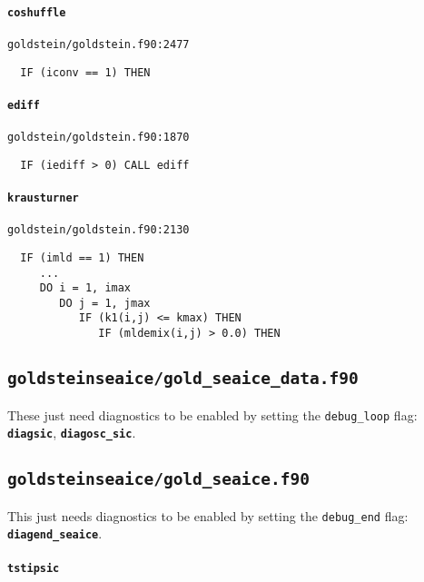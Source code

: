 \documentclass[a4paper,10pt,article]{memoir}
\begin{document}
\paragraph{\texttt{coshuffle}}

\texttt{goldstein/goldstein.f90:2477}

\begin{verbatim}
  IF (iconv == 1) THEN
\end{verbatim}

\paragraph{\texttt{ediff}}

\texttt{goldstein/goldstein.f90:1870}

\begin{verbatim}
  IF (iediff > 0) CALL ediff
\end{verbatim}

\paragraph{\texttt{krausturner}}

\texttt{goldstein/goldstein.f90:2130}

\begin{verbatim}
  IF (imld == 1) THEN
     ...
     DO i = 1, imax
        DO j = 1, jmax
           IF (k1(i,j) <= kmax) THEN
              IF (mldemix(i,j) > 0.0) THEN
\end{verbatim}


\subsection*{\texttt{goldsteinseaice/gold\_seaice\_data.f90}}

These just need diagnostics to be enabled by setting the
\texttt{debug\_loop} flag: \textbf{\texttt{diagsic}},
\textbf{\texttt{diagosc\_sic}}.


\subsection*{\texttt{goldsteinseaice/gold\_seaice.f90}}

This just needs diagnostics to be enabled by setting the
\texttt{debug\_end} flag: \textbf{\texttt{diagend\_seaice}}.

\paragraph{\texttt{tstipsic}}
\end{document}
